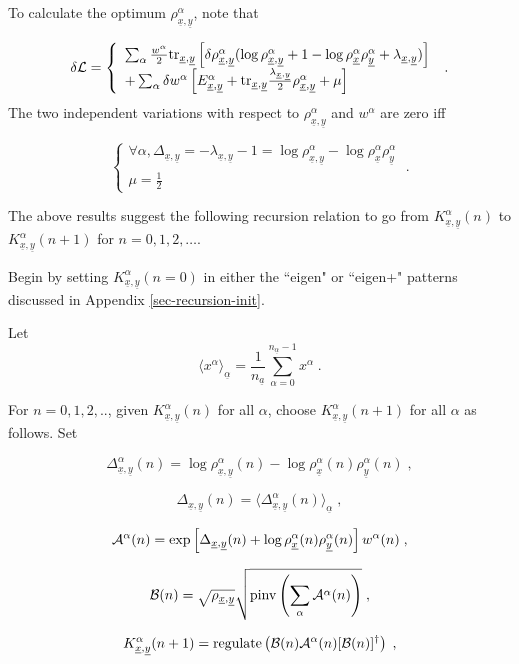 \documentclass[12pt]{article}%
\newcommand{\av}[1]{\langle#1\rangle}
\newcommand{\tr}[0]{{\rm tr }}
\newcommand{\beq}{\begin{equation}}
\newcommand{\eeq}{\end{equation}}
\newcommand{\ul}[1]{\underline{#1}}
\newcommand{\rva}[0]{{\ul{a}}}
\newcommand{\rvx}[0]{{\ul{x}}}
\newcommand{\rvy}[0]{{\ul{y}}}
\newcommand{\cala}[0]{{\cal A}}
\newcommand{\calb}[0]{{\cal B}}
\newcommand{\lam}[0]{\lambda}
\newcommand{\rvalp}[0]{{\ul{\alpha}}}
\newcommand{\alp}[0]{{\alpha}}
\begin{document}
To calculate the optimum $\rho^\alp_{\rvx,\rvy}$, note that

\beq
\delta{\cal L}=\left\{
\begin{array}{l}
\sum_\alp \frac{w^\alp}{2}\tr_{\rvx, \rvy}\left[\delta\rho^\alp_{\rvx,\rvy}
(\log \rho^\alp_{\rvx,\rvy}+1
-\log \rho^{\alp}_{\rvx}
\rho^{\alp}_{\rvy}
+\lam_{\rvx,\rvy})\right]\\
+\sum_\alp\delta w^\alp\left[
E^\alp_{\rvx,\rvy}
+\tr_{\rvx, \rvy}
\frac{\lam_{\rvx,\rvy}}{2}
\rho^\alp_{\rvx,\rvy}
+\mu\right]
\end{array}
\right.
\;.
\eeq
The two independent variations with respect to $\rho^\alp_{\rvx,\rvy}$
and $w^\alp$ are zero iff

\beq
\left\{
\begin{array}{l}
\forall \alp,
\Delta_{\rvx, \rvy}=-\lam_{\rvx, \rvy}-1
=
\log \rho^{\alp}_{\rvx,\rvy}
-
\log \rho^{\alp}_{\rvx}
\rho^{\alp}_{\rvy}
\\
\mu=\frac{1}{2}
\end{array}
\right.
\;.
\eeq

The above results suggest
the following recursion relation to go from
$K^{\alp}_{\rvx,\rvy}(n)$
to $K^{\alp}_{\rvx,\rvy}(n+1)$ for $n=0,1,2,\ldots$.

Begin by setting $K^{\alp}_{\rvx,\rvy}(n=0)$
in either the ``eigen" or ``eigen+" patterns discussed in
Appendix \ref{sec-recursion-init}.



Let
\beq
\av{x^\alp}_\rvalp = \frac{1}{n_\rva}\sum_{\alp=0}^{n_\rvalp-1}x^\alp
\;.
\eeq



For $n=0,1,2, ..$, given $K^{\alp}_{\rvx,\rvy}(n)$ for all $\alp$,
choose $K^{\alp}_{\rvx,\rvy}(n+1)$ for all $\alp$ as follows.
Set

\beq
\Delta^\alp_{\rvx, \rvy}(n)=
\log \rho^{\alp}_{\rvx,\rvy}(n)
-
\log \rho^{\alp}_{\rvx}(n)
\rho^{\alp}_{\rvy}(n)
\;,
\eeq

\beq
\Delta_{\rvx, \rvy}(n)=
\av{\Delta^\alp_{\rvx, \rvy}(n)}_\rvalp
\;,
\eeq


\beq
\cala^\alp(n)=
\exp\left[
\Delta_{\rvx, \rvy}(n)
+
\log \rho^{\alp}_{\rvx}(n)
\rho^{\alp}_{\rvy}(n)
\right]w^\alp(n)
\;,
\eeq

\beq
\calb(n)=
\sqrt{\rho_{\rvx, \rvy}}
\sqrt{{\rm pinv}\left(\sum_\alp \cala^\alp(n)\right)}
\;,
\eeq


\beq
K^{\alp}_{\rvx,\rvy}(n+1)
=
{\rm regulate}\left(\calb(n)
\cala^\alp(n)[\calb(n)]^\dagger\right)
\;,\label{eq-squashed-only1}
\eeq
\end{document}
